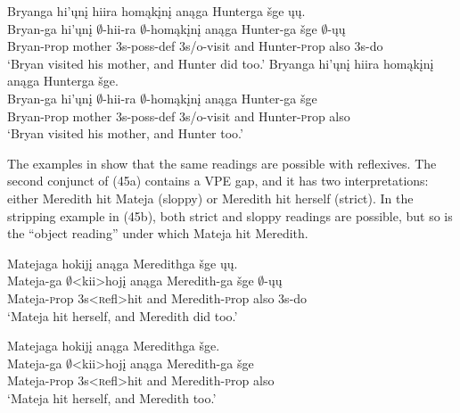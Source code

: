\documentclass[output=paper]{LSP/langsci}
\begin{document}
\begin{exe}
\ex
\begin{xlist}
\ex
\glll Bryanga hi'ųnį hiira homąkįnį anąga Hunterga šge ųų.\\
Bryan-ga hi'ųnį $\emptyset$-hii-ra $\emptyset$-homąkįnį anąga Hunter-ga šge $\emptyset$-ųų\\
Bryan-{\textsc prop} mother {\textsc 3s-poss-def} {\textsc 3s/o}-visit and Hunter-{\textsc prop} also {\textsc 3s}-do\\
\trans `Bryan visited his mother, and Hunter did too.'
\ex
\glll Bryanga hi'ųnį hiira homąkįnį anąga Hunterga šge.\\
Bryan-ga hi'ųnį $\emptyset$-hii-ra $\emptyset$-homąkįnį anąga Hunter-ga šge\\
Bryan-{\textsc prop} mother {\textsc 3s-poss-def} {\textsc 3s/o}-visit and Hunter-{\textsc prop} also\\
\trans `Bryan visited his mother, and Hunter too.'
\end{xlist}
\end{exe}

The examples in  show that the same readings are possible with reflexives. The second conjunct of (45a) contains a VPE gap, and it has two interpretations: either Meredith hit Mateja (sloppy) or Meredith hit herself (strict). In the stripping example in (45b), both strict and sloppy readings are possible, but so is the ``object reading'' under which Mateja hit Meredith.

\begin{exe}
\ex
\begin{xlist}
\ex
\glll Matejaga hokijį anąga Meredithga šge ųų.\\
Mateja-ga $\emptyset$<kii>hojį anąga Meredith-ga šge $\emptyset$-ųų\\
Mateja-{\textsc prop} {\textsc 3s}<{\textsc refl}>hit and Meredith-{\textsc prop} also {\textsc 3s}-do\\
\trans `Mateja hit herself, and Meredith did too.'

\ex
\glll Matejaga hokijį anąga Meredithga šge.\\
Mateja-ga $\emptyset$<kii>hojį anąga Meredith-ga šge\\ 
Mateja-{\textsc prop} {\textsc 3s}<{\textsc refl}>hit and Meredith-{\textsc prop} also\\ 
\trans `Mateja hit herself, and Meredith too.'
\end{xlist}
\end{exe}
\end{document}
